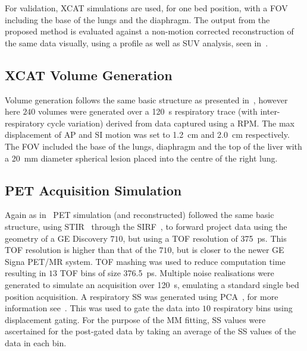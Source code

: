             For validation, \gls{XCAT} simulations are used, for one bed position, with a \gls{FOV} including the base of the lungs and the diaphragm. The output from the proposed method is evaluated against a non-motion corrected reconstruction of the same data visually, using a profile as well as \gls{SUV} analysis, seen in~.
            
            \subsection{XCAT Volume Generation} \label{sec:pet_ct_respiratory_motion_correction_with_a_single_attenuation_map_using_nAC_derived_deformation_fields_methods_xcat_volume_generation}
                Volume generation follows the same basic structure as presented in~, however here $240$ volumes were generated over a \SI{120}{\second} respiratory trace (with inter-respiratory cycle variation) derived from data captured using a \gls{RPM}. The max displacement of \gls{AP} and \gls{SI} motion was set to \SI{1.2}{\centi\metre} and \SI{2.0}{\centi\metre} respectively. The \gls{FOV} included the base of the lungs, diaphragm and the top of the liver with a \SI{20}{\milli\metre} diameter spherical lesion placed into the centre of the right lung.
    
            \subsection{PET Acquisition Simulation} \label{sec:pet_ct_respiratory_motion_correction_with_a_single_attenuation_map_using_nAC_derived_deformation_fields_methods_pet_acquisition_simulation}
                Again as in~ \gls{PET} simulation (and reconstructed) followed the same basic structure, using \gls{STIR}~\parencite{Thielemans2012, Nikos2019, Wadhwa2021PETLibrary} through the \gls{SIRF}~\parencite{Ovtchinnikov2017}, to forward project data using the geometry of a \gls{GE} Discovery $710$, but using a \gls{TOF} resolution of \SI{375}{\pico\second}. This \gls{TOF} resolution is higher than that of the $710$, but is closer to the newer \gls{GE} Signa \gls{PET}/\gls{MR} system. \gls{TOF} mashing was used to reduce computation time resulting in $13$ \gls{TOF} bins of size \SI{376.5}{\pico\second}. Multiple noise realisations were generated to simulate an acquisition over \SI{120}{\second}, emulating a standard single bed position acquisition. A respiratory \gls{SS} was generated using \gls{PCA}~\parencite{Thielemans2011}, for more information see~. This was used to gate the data into $10$ respiratory bins using displacement gating. For the purpose of the \gls{MM} fitting, \gls{SS} values were ascertained for the post-gated data by taking an average of the \gls{SS} values of the data in each bin.
            
